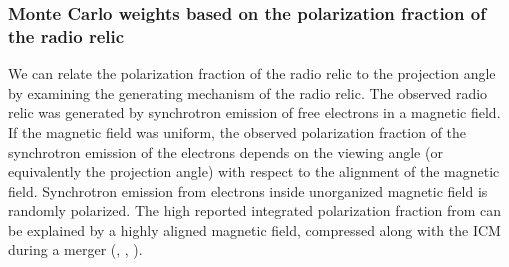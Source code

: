 \documentclass[ucdthesis.tex]{subfiles}
\begin{document}
    
    \subsubsection{Monte Carlo weights based on the polarization fraction of the radio relic}
    \label{subsubsec:polar_frac}
    
    We can relate the polarization fraction of the radio relic to the
    projection angle by examining the
    generating mechanism of the radio relic.
    The observed radio relic was generated by synchrotron emission of free electrons in a
    magnetic field. If the magnetic field was uniform, the observed
    polarization fraction of the synchrotron emission of the electrons depends on the
    viewing angle (or equivalently the projection angle) with respect to the
    alignment of the magnetic field. Synchrotron emission from electrons inside
    unorganized magnetic field is
    randomly polarized. The high reported integrated polarization fraction from
    \citet{L13} can be explained by a highly aligned magnetic field,
    compressed along with the ICM during a merger
    (\citealt{E98}, \citealt{vanWeeren10}, \citealt{Feretti12}).
    \par
    
\end{document}
